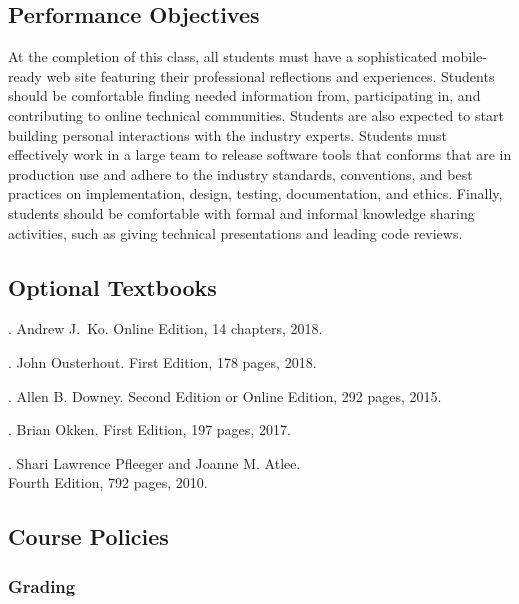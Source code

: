 \documentclass[11pt]{article}
\begin{document}
\subsection*{Performance Objectives}

At the completion of this class, all students must have a sophisticated
mobile-ready web site featuring their professional reflections and experiences.
Students should be comfortable finding needed information from, participating
in, and contributing to online technical communities. Students are also expected
to start building personal interactions with the industry experts.
%
Students must effectively work in a large team to release software tools that
conforms that are in production use and adhere to the industry standards,
conventions, and best practices on implementation, design, testing,
documentation, and ethics.
%
Finally, students should be comfortable with formal and informal knowledge
sharing activities, such as giving technical presentations and leading code
reviews.

\subsection*{Optional Textbooks}

. Andrew J.\ Ko.
Online Edition, 14 chapters, 2018.
%
\vspace*{.25em}

. John Ousterhout.
First Edition, 178 pages, 2018.
%
\vspace*{.25em}

. Allen B. Downey.
Second Edition or Online Edition, 292 pages, 2015.
%
\vspace*{.25em}

. Brian Okken.
First Edition, 197 pages, 2017.
%
\vspace*{.5em}

. Shari Lawrence
Pfleeger and Joanne M. Atlee.\\ Fourth Edition, 792 pages, 2010.

\vspace*{-.25em}
\subsection*{Course Policies}

\subsubsection*{Grading}
\end{document}
